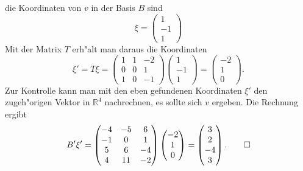 \begin{loesung}
die Koordinaten von $v$ in der Basis $B$ sind 
\[
\xi
=
\begin{pmatrix}
1\\-1\\1
\end{pmatrix}
\]
Mit der Matrix $T$ erh"alt man daraus die Koordinaten
\[
\xi'=T\xi=
\begin{pmatrix}
1&1&-2\\
0&0& 1\\
1&0&-1
\end{pmatrix}
\begin{pmatrix}
1\\-1\\1
\end{pmatrix}
=
\begin{pmatrix}
-2\\1\\0
\end{pmatrix}.
\]
Zur Kontrolle kann man mit den eben gefundenen Koordinaten $\xi'$ den
zugeh"origen Vektor in $\mathbb R^4$ nachrechnen, es sollte sich $v$
ergeben. Die Rechnung ergibt
\[
B'\xi'=
\begin{pmatrix}
-4&-5& 6\\
-1& 0& 1\\
 5& 6&-4\\
 4&11&-2
\end{pmatrix}
\begin{pmatrix}
-2\\1\\0
\end{pmatrix}
=
\begin{pmatrix}
3\\2\\-4\\3
\end{pmatrix}.
\qedhere
\]
\end{loesung}


